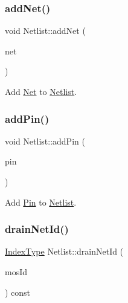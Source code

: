 \subsubsection{\texorpdfstring{add\+Net()}{addNet()}}
{\footnotesize\ttfamily void Netlist\+::add\+Net (\begin{DoxyParamCaption}\item[{\hyperlink{classNet}{Net} \&}]{net }\end{DoxyParamCaption})\hspace{0.3cm}{\ttfamily [inline]}}



Add \hyperlink{classNet}{Net} to \hyperlink{classNetlist}{Netlist}. 

\mbox{\label{classNetlist_af0e34bf0cae6f4dd74e4e553c9e7ca1c}} 
\subsubsection{\texorpdfstring{add\+Pin()}{addPin()}}
{\footnotesize\ttfamily void Netlist\+::add\+Pin (\begin{DoxyParamCaption}\item[{\hyperlink{classPin}{Pin} \&}]{pin }\end{DoxyParamCaption})\hspace{0.3cm}{\ttfamily [inline]}}



Add \hyperlink{classPin}{Pin} to \hyperlink{classNetlist}{Netlist}. 

\mbox{\label{classNetlist_aa7a9014b2e827cec0bf76a584c551157}} 
\subsubsection{\texorpdfstring{drain\+Net\+Id()}{drainNetId()}}
{\footnotesize\ttfamily \hyperlink{type_8h_a581e8093e28e7362f2b6937296190676}{Index\+Type} Netlist\+::drain\+Net\+Id (\begin{DoxyParamCaption}\item[{\hyperlink{type_8h_a581e8093e28e7362f2b6937296190676}{Index\+Type}}]{mos\+Id }\end{DoxyParamCaption}) const\hspace{0.3cm}{\ttfamily [inline]}}



